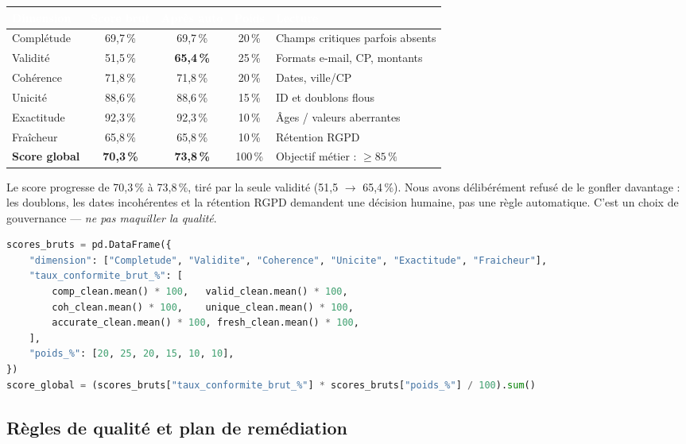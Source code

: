 \documentclass[11pt]{article}
\newcommand{\thead}[1]{\textbf{\textcolor{white}{#1}}}
\begin{document}
\begin{center}
\begin{tabularx}{\linewidth}{@{}>{\raggedright\arraybackslash}X ccc>{\raggedright\arraybackslash}p{4.6cm}@{}}
\toprule
\rowcolor{tableHeader}
\thead{Dimension} & \thead{Score brut} & \thead{Après auto} & \thead{Poids} & \thead{Lecture} \\
\midrule
Complétude & 69,7\,\% & 69,7\,\% & 20\,\% & Champs critiques parfois absents \\
Validité & 51,5\,\% & \textbf{65,4\,\%} & 25\,\% & Formats e-mail, CP, montants \\
Cohérence & 71,8\,\% & 71,8\,\% & 20\,\% & Dates, ville/CP \\
Unicité & 88,6\,\% & 88,6\,\% & 15\,\% & ID et doublons flous \\
Exactitude & 92,3\,\% & 92,3\,\% & 10\,\% & Âges / valeurs aberrantes \\
Fraîcheur & 65,8\,\% & 65,8\,\% & 10\,\% & Rétention RGPD \\
\midrule
\rowcolor{tableRowAlt}
\textbf{Score global} & \textbf{70,3\,\%} & \textbf{73,8\,\%} & 100\,\% & Objectif métier : $\geq 85\,\%$ \\
\bottomrule
\end{tabularx}
\end{center}

Le score progresse de 70,3\,\% à 73,8\,\%, tiré par la seule validité (51,5 $\to$
65,4\,\%). Nous avons délibérément refusé de le gonfler davantage : les doublons, les
dates incohérentes et la rétention RGPD demandent une décision humaine, pas une
règle automatique. C'est un choix de gouvernance --- \emph{ne pas maquiller la
qualité}.

\begin{lstlisting}[language=Python,caption={Extrait de projet CarePlus : agrégation du score global pondéré par dimension.}]
scores_bruts = pd.DataFrame({
    "dimension": ["Completude", "Validite", "Coherence", "Unicite", "Exactitude", "Fraicheur"],
    "taux_conformite_brut_%": [
        comp_clean.mean() * 100,   valid_clean.mean() * 100,
        coh_clean.mean() * 100,    unique_clean.mean() * 100,
        accurate_clean.mean() * 100, fresh_clean.mean() * 100,
    ],
    "poids_%": [20, 25, 20, 15, 10, 10],
})
score_global = (scores_bruts["taux_conformite_brut_%"] * scores_bruts["poids_%"] / 100).sum()
\end{lstlisting}

\subsection{Règles de qualité et plan de remédiation}
\end{document}
